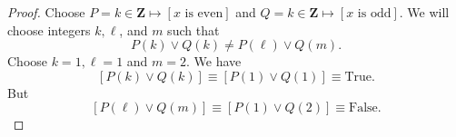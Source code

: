 \documentclass[12pt,fleqn,answers]{exam}
\newcommand{\true}{\mathrm{True}}
\newcommand{\false}{\mathrm{False}}
\newcommand{\integers}{\mathbf{Z}}
\renewenvironment{solution}
  {\begin{shaded*}} %
  {\end{shaded*}}   %
\begin{document}
\begin{questions}
\begin{solution} 
  \begin{proof} 
    Choose $P = k \in \integers \mapsto \left[x \mbox{ is even}\right]$
    and $Q = k \in \integers \mapsto \left[x \mbox{ is odd}\right]$.
    We will choose integers $k,\ell$, and $m$ such that
    \begin{equation*}
      P(k) \lor Q(k) \neq P(\ell) \lor Q(m).
    \end{equation*}
    Choose $k = 1, \ell = 1$ and $m = 2$. We have
    \begin{equation*}
      \left[P(k) \lor Q(k) \right] \equiv \left[P(1) \lor Q(1)\right]
      \equiv \true.
    \end{equation*}
    But
    \begin{equation*}
      \left[P(\ell) \lor Q(m) \right] \equiv \left[P(1) \lor Q(2)\right]
      \equiv \false.
    \end{equation*}
     \end{proof}
  
 
\end{solution}

\end{questions}
\end{document}
